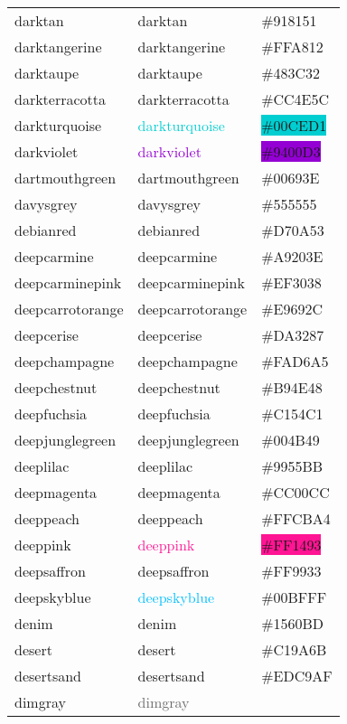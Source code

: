 \documentclass[
]{article}
\begin{document}
\begin{longtable}[]{@{}lll@{}}
darktan & \textcolor{darktan}{darktan} &
\colorbox{darktan}{\#918151}\tabularnewline
darktangerine & \textcolor{darktangerine}{darktangerine} &
\colorbox{darktangerine}{\#FFA812}\tabularnewline
darktaupe & \textcolor{darktaupe}{darktaupe} &
\colorbox{darklava}{\#483C32}\tabularnewline
darkterracotta & \textcolor{darkterracotta}{darkterracotta} &
\colorbox{darkterracotta}{\#CC4E5C}\tabularnewline
darkturquoise & \textcolor{darkturquoise}{darkturquoise} &
\colorbox{darkturquoise}{\#00CED1}\tabularnewline
darkviolet & \textcolor{darkviolet}{darkviolet} &
\colorbox{darkviolet}{\#9400D3}\tabularnewline
dartmouthgreen & \textcolor{dartmouthgreen}{dartmouthgreen} &
\colorbox{dartmouthgreen}{\#00693E}\tabularnewline
davysgrey & \textcolor{davysgrey}{davysgrey} &
\colorbox{davysgrey}{\#555555}\tabularnewline
debianred & \textcolor{debianred}{debianred} &
\colorbox{debianred}{\#D70A53}\tabularnewline
deepcarmine & \textcolor{deepcarmine}{deepcarmine} &
\colorbox{deepcarmine}{\#A9203E}\tabularnewline
deepcarminepink & \textcolor{deepcarminepink}{deepcarminepink} &
\colorbox{deepcarminepink}{\#EF3038}\tabularnewline
deepcarrotorange & \textcolor{deepcarrotorange}{deepcarrotorange} &
\colorbox{deepcarrotorange}{\#E9692C}\tabularnewline
deepcerise & \textcolor{deepcerise}{deepcerise} &
\colorbox{deepcerise}{\#DA3287}\tabularnewline
deepchampagne & \textcolor{deepchampagne}{deepchampagne} &
\colorbox{deepchampagne}{\#FAD6A5}\tabularnewline
deepchestnut & \textcolor{deepchestnut}{deepchestnut} &
\colorbox{deepchestnut}{\#B94E48}\tabularnewline
deepfuchsia & \textcolor{deepfuchsia}{deepfuchsia} &
\colorbox{deepfuchsia}{\#C154C1}\tabularnewline
deepjunglegreen & \textcolor{deepjunglegreen}{deepjunglegreen} &
\colorbox{deepjunglegreen}{\#004B49}\tabularnewline
deeplilac & \textcolor{deeplilac}{deeplilac} &
\colorbox{deeplilac}{\#9955BB}\tabularnewline
deepmagenta & \textcolor{deepmagenta}{deepmagenta} &
\colorbox{deepmagenta}{\#CC00CC}\tabularnewline
deeppeach & \textcolor{deeppeach}{deeppeach} &
\colorbox{deeppeach}{\#FFCBA4}\tabularnewline
deeppink & \textcolor{deeppink}{deeppink} &
\colorbox{deeppink}{\#FF1493}\tabularnewline
deepsaffron & \textcolor{deepsaffron}{deepsaffron} &
\colorbox{deepsaffron}{\#FF9933}\tabularnewline
deepskyblue & \textcolor{deepskyblue}{deepskyblue} &
\colorbox{capri}{\#00BFFF}\tabularnewline
denim & \textcolor{denim}{denim} &
\colorbox{denim}{\#1560BD}\tabularnewline
desert & \textcolor{desert}{desert} &
\colorbox{camel}{\#C19A6B}\tabularnewline
desertsand & \textcolor{desertsand}{desertsand} &
\colorbox{desertsand}{\#EDC9AF}\tabularnewline
dimgray & \textcolor{dimgray}{dimgray} &

\end{longtable}
\end{document}
